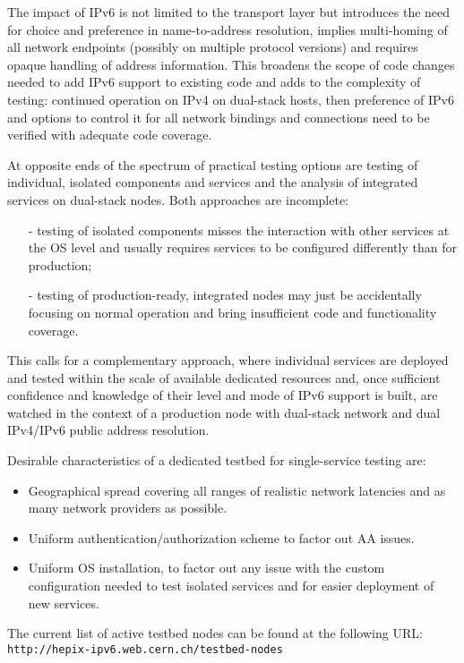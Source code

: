 The impact of IPv6 is not limited to the transport layer 
but introduces the need for choice and preference in name-to-address 
resolution, implies multi-homing of all network endpoints (possibly on 
multiple protocol versions) and requires opaque handling of address 
information. This broadens the scope of code changes needed to add
IPv6 support to existing code and adds to the complexity of testing:
continued operation on IPv4 on dual-stack hosts, then preference of IPv6 and 
options to control it for all network bindings and connections
need to be verified with adequate code coverage.
\par
At opposite ends of the spectrum of practical testing options are
testing of individual, isolated components and services and the analysis of 
integrated services on dual-stack nodes. Both approaches are incomplete:
\begin{itemize}
\item[-] testing of isolated components misses the interaction with other
services at the OS level and usually requires services to be configured
differently than for production;
\item[-] testing of production-ready, integrated nodes may just be 
accidentally focusing on normal operation and bring insufficient 
code and functionality coverage.
\end{itemize}
This calls for a complementary approach,
where individual services are deployed and tested within the scale of
available dedicated resources and, once sufficient confidence and knowledge
of their level and mode of IPv6 support is built, are watched in the context
of a production node with dual-stack network and dual IPv4/IPv6 public address
resolution.
\par
Desirable characteristics of a dedicated testbed for single-service testing are:
\begin{itemize}
\item Geographical spread covering all ranges of realistic network latencies
and as many network providers as possible.
\item Uniform authentication/authorization scheme to factor out AA issues.
\item Uniform OS installation, to factor out any issue with the custom 
configuration needed to test isolated services and for easier
deployment of new services.
\end{itemize}
The current list of active testbed nodes can be found at the following URL:\\
{\tt http://hepix-ipv6.web.cern.ch/testbed-nodes}\\
